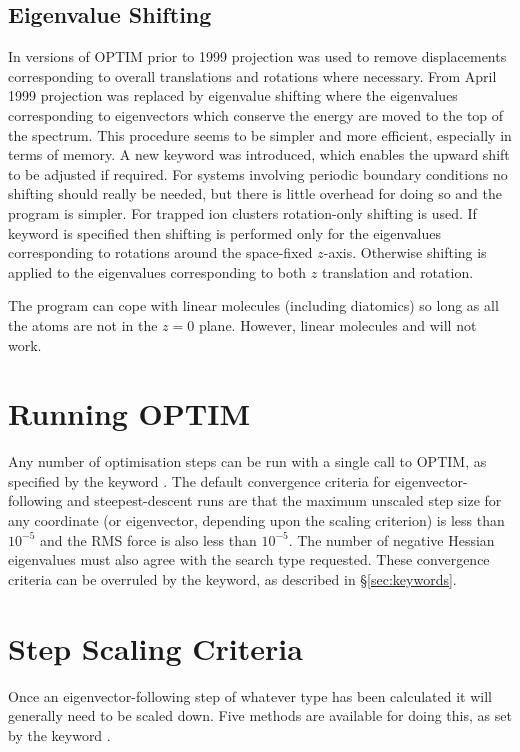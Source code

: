 {{{\subsection{Eigenvalue Shifting}In versions of OPTIM prior to 1999
projection was used to remove displacements corresponding to 
overall translations and rotations where necessary.\cite{bakerh91,wales93d}
From April 1999 projection was replaced by eigenvalue shifting where the
eigenvalues corresponding to eigenvectors which conserve the energy
are moved to the top of the spectrum. This procedure seems to be simpler
and more efficient, especially in terms of memory. A new keyword {}
was introduced, which enables the upward shift to be adjusted if required.
For systems involving periodic boundary conditions no shifting should really be
needed, but there is little overhead for doing so and the program is simpler.
For trapped ion clusters
rotation-only shifting is used. If keyword {} is specified then shifting is performed
only for the eigenvalues corresponding to
rotations around the space-fixed $z$-axis. Otherwise shifting is applied to the
eigenvalues corresponding to both $z$ translation and rotation.

The program can cope with linear molecules (including diatomics) so long as all the atoms
are not in the $z=0$ plane. However, linear molecules and {} will not work.

\section{Running OPTIM}
\label{sec:running}
Any number of optimisation steps can be run with a
single call to OPTIM, as specified by the keyword {}.
The default convergence criteria for eigenvector-following and steepest-descent runs are
that the maximum unscaled step size for
any coordinate (or eigenvector, depending upon the scaling criterion) is less
than $10^{-5}$ and the RMS force is also less than $10^{-5}$.
The number of negative Hessian eigenvalues must also agree with the search type requested.
These convergence criteria can be overruled by the 
{} keyword, as described in \S\ref{sec:keywords}.

\section{Step Scaling Criteria}
\label{sec:scaling}
Once an eigenvector-following step of whatever
type has been calculated it will generally need to be scaled down. Five methods
are available for doing this, as set by the keyword {}. 

}}}
